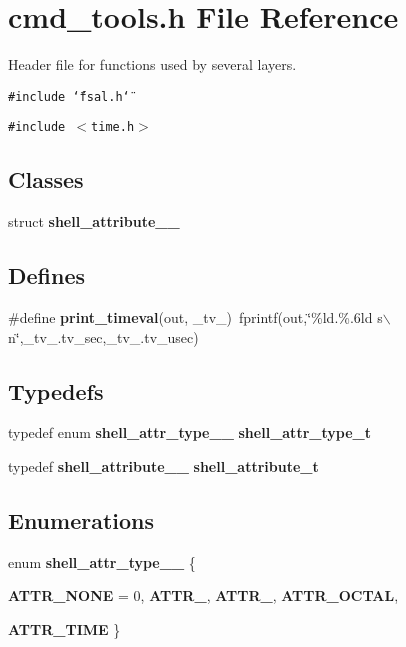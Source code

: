 \section{cmd\_\-tools.h File Reference}
\label{cmd__tools_8h}
Header file for functions used by several layers. 

{\tt \#include \char`\"{}fsal.h\char`\"{}}\par
{\tt \#include $<$time.h$>$}\par
\subsection*{Classes}
\begin{CompactItemize}
\item 
struct {\bf shell\_\-attribute\_\-\_\-}
\end{CompactItemize}
\subsection*{Defines}
\begin{CompactItemize}
\item 
\#define {\bf print\_\-timeval}(out, \_\-tv\_\-)\ fprintf(out,\char`\"{}\%ld.\%.6ld s$\backslash$n\char`\"{},\_\-tv\_\-.tv\_\-sec,\_\-tv\_\-.tv\_\-usec)
\end{CompactItemize}
\subsection*{Typedefs}
\begin{CompactItemize}
\item 
typedef enum {\bf shell\_\-attr\_\-type\_\-\_\-} {\bf shell\_\-attr\_\-type\_\-t}
\item 
typedef {\bf shell\_\-attribute\_\-\_\-} {\bf shell\_\-attribute\_\-t}
\end{CompactItemize}
\subsection*{Enumerations}
\begin{CompactItemize}
\item 
enum {\bf shell\_\-attr\_\-type\_\-\_\-} \{ \par
{\bf ATTR\_\-NONE} =  0, 
{\bf ATTR\_}, 
{\bf ATTR\_}, 
{\bf ATTR\_\-OCTAL}, 
\par
{\bf ATTR\_\-TIME}
 \}
\end{CompactItemize}
